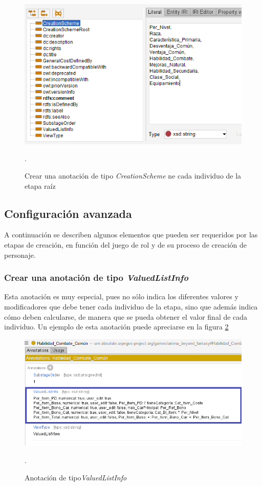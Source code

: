 \begin{enumerate}
    \begin{figure}[H]
        \centering
        \includegraphics[scale=0.6]{Figures/Protege/CreationScheme.png}
        \caption{Crear una anotación de tipo \textit{CreationScheme} ne cada individuo de la etapa raíz}.
        \label{CreationScheme}
    \end{figure}
\end{enumerate}

\subsection{Configuración avanzada}
A continuación se describen algunos elementos que pueden ser requeridos por las etapas de creación, en función del juego de rol y 
de su proceso de creación de personaje.

\subsubsection{Crear una anotación de tipo \textit{ValuedListInfo}}\label{ValuedListInfo}
Esta anotación es muy especial, pues no sólo indica los diferentes valores y modificadores que debe tener cada individuo de la etapa, 
sino que además indica cómo deben calcularse, de manera que se pueda obtener el valor final de cada individuo. Un ejemplo de 
esta anotación puede apreciarse en la figura \ref*{ValuedListInfo_Begin}\medskip

\begin{figure}[H]
    \centering
    \includegraphics[scale=0.6]{Figures/Protege/ValuedListInfo_End.png}
    \caption{Anotación de tipo\textit{ValuedListInfo}}.
    \label{ValuedListInfo_Begin}
\end{figure}

